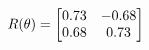 \documentclass[preview]{standalone}
\begin{document}
\begin{align*}
\special{dvisvgm:raw <g id='unique000'>}R(\theta) = \begin{bmatrix}0.73 & -0.68\\0.68 & 0.73\end{bmatrix}\special{dvisvgm:raw </g>}
\end{align*}
\end{document}
